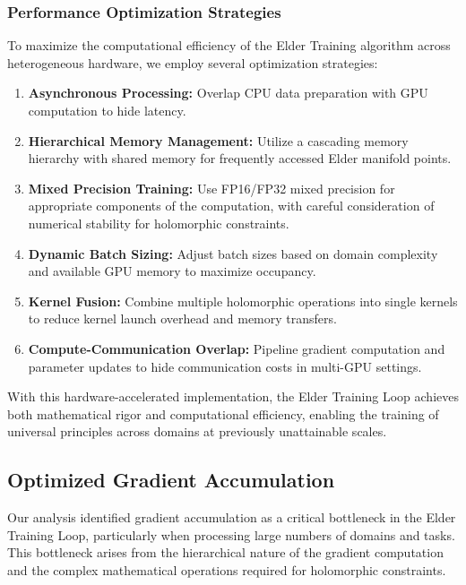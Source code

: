 \subsubsection{Performance Optimization Strategies}

To maximize the computational efficiency of the Elder Training algorithm across heterogeneous hardware, we employ several optimization strategies:

\begin{enumerate}
    \item \textbf{Asynchronous Processing:} Overlap CPU data preparation with GPU computation to hide latency.
    
    \item \textbf{Hierarchical Memory Management:} Utilize a cascading memory hierarchy with shared memory for frequently accessed Elder manifold points.
    
    \item \textbf{Mixed Precision Training:} Use FP16/FP32 mixed precision for appropriate components of the computation, with careful consideration of numerical stability for holomorphic constraints.
    
    \item \textbf{Dynamic Batch Sizing:} Adjust batch sizes based on domain complexity and available GPU memory to maximize occupancy.
    
    \item \textbf{Kernel Fusion:} Combine multiple holomorphic operations into single kernels to reduce kernel launch overhead and memory transfers.
    
    \item \textbf{Compute-Communication Overlap:} Pipeline gradient computation and parameter updates to hide communication costs in multi-GPU settings.
\end{enumerate}

With this hardware-accelerated implementation, the Elder Training Loop achieves both mathematical rigor and computational efficiency, enabling the training of universal principles across domains at previously unattainable scales.

\subsection{Optimized Gradient Accumulation}

Our analysis identified gradient accumulation as a critical bottleneck in the Elder Training Loop, particularly when processing large numbers of domains and tasks. This bottleneck arises from the hierarchical nature of the gradient computation and the complex mathematical operations required for holomorphic constraints.

